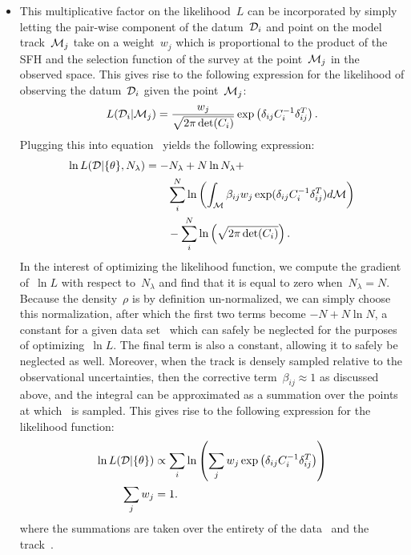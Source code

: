 \documentclass[ms.tex]{subfiles}
\begin{document}
\begin{itemize}
	\item This multiplicative factor on the likelihood~$L$ can be incorporated
	by simply letting the pair-wise component of the datum~$\mathcal{D}_i$ and
	point on the model track~$\mathcal{M}_j$ take on a weight~$w_j$ which is
	proportional to the product of the SFH and the selection function of the
	survey at the point~$\mathcal{M}_j$ in the observed space.
	This gives rise to the following expression for the likelihood of observing
	the datum~$\mathcal{D}_i$ given the point~$\mathcal{M}_j$:
	\begin{equation}
	L(\mathcal{D}_i | \mathcal{M}_j) = \frac{w_j}{\sqrt{2\pi \det(C_i)}}
	\exp\left(\delta_{ij} C_i^{-1} \delta_{ij}^T\right).
	\end{equation}
	Plugging this into equation~ yields the following
	expression:
	\begin{equation}
	\begin{split}
	\ln L(\mathcal{D} | \{\theta\}, N_\lambda) &=
	-N_\lambda + N \ln N_\lambda +
	\\ &\qquad \sum_i^N \ln
	\left(\int_{\mathcal{M}} \beta_{ij} w_j\exp(\delta_{ij} C_i^{-1} \delta_{ij}^T)
	d\mathcal{M}\right)
	\\ &\qquad - \sum_i^N \ln \left(\sqrt{2\pi \det(C_i)}\right).
	\end{split}
	\end{equation}
	In the interest of optimizing the likelihood function, we compute the
	gradient of~$\ln L$ with respect to~$N_\lambda$ and find that it is equal
	to zero when~$N_\lambda = N$.
	Because the density~$\rho$ is by definition un-normalized, we can
	simply choose this normalization, after which the first two terms become
	$-N + N \ln N$, a constant for a given data set~ which can safely
	be neglected for the purposes of optimizing~$\ln L$.
	The final term is also a constant, allowing it to safely be neglected as
	well.
	Moreover, when the track is densely sampled relative to the observational
	uncertainties, then the corrective term~$\beta_{ij} \approx 1$ as discussed
	above, and the integral can be approximated as a summation over the points
	at which~ is sampled.
	This gives rise to the following expression for the likelihood function:
	\begin{subequations}\begin{align}
	\ln L(\mathcal{D} | \{\theta\}) &\propto
	\sum_i \ln \left(\sum_j w_j
	\exp\left(\delta_{ij} C_i^{-1} \delta_{ij}^T\right)\right)
	\\
	\sum_j w_j &= 1.
	\end{align}\end{subequations}
	where the summations are taken over the entirety of the data~ and
	the track~.

\end{itemize}
\end{document}
